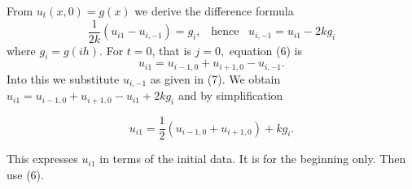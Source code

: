 From $u_{t}(x,0)=g(x)$ we derive the difference formula
\begin{equation}\tag{22.7}
\frac{1}{2k}(u_{i1}-u_{i,-1})=g_{i}, \hspace{10pt} \text{hence} \hspace{10pt} u_{i,-1}=u_{i1}-2kg_{i}
\end{equation}
where $g_{i}=g(ih).$ For $t=0$, that is $j=0,$ equation (6) is
\begin{equation*}
u_{i1}=u_{i-1,0}+u_{i+1,0}-u_{i,-1}.
\end{equation*}
Into this we substitute $u_{i,-1}$ as given in (7). We obtain $u_{i1}=u_{i-1,0}+u_{i+1,0}-u_{i1}+2kg_{i}$ and by simplification \\
\begin{graybox}
\begin{equation}\tag{22.8}
u_{i1}=\frac{1}{2}(u_{i-1,0}+u_{i+1,0})+kg_{i}.
\end{equation}
\end{graybox}
This expresses $u_{i1}$ in terms of the initial data. It is for the beginning only. Then use (6).
